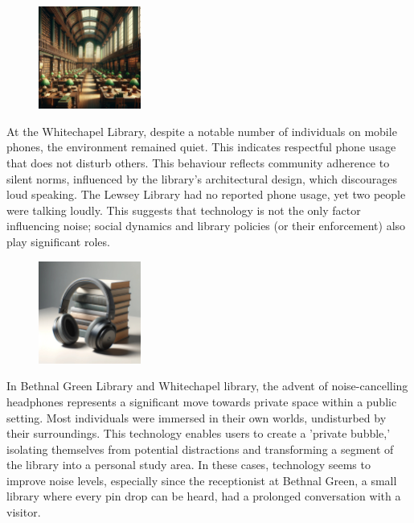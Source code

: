 \documentclass{novel}
\begin{document}
\begin{figure} 
\vspace{-\intextsep}
    \includegraphics[width=0.3\textwidth]{resources/whitechapel.jpg}
\end{figure}
At the Whitechapel Library, despite a notable number of individuals on mobile phones, the environment remained quiet. This indicates respectful phone usage that does not disturb others. This behaviour reflects community adherence to silent norms, influenced by the library's architectural design, which discourages loud speaking. The Lewsey Library had no reported phone usage, yet two people were talking loudly. This suggests that technology is not the only factor influencing noise; social dynamics and library policies (or their enforcement) also play significant roles.

\begin{figure} 
    \includegraphics[width=0.3\textwidth]{resources/headphones.jpg}
\end{figure}
In Bethnal Green Library and Whitechapel library, the advent of noise-cancelling headphones represents a significant move towards private space within a public setting. Most individuals were immersed in their own worlds, undisturbed by their surroundings. This technology enables users to create a 'private bubble,' isolating themselves from potential distractions and transforming a segment of the library into a personal study area. In these cases, technology seems to improve noise levels, especially since the receptionist at Bethnal Green, a small library where every pin drop can be heard, had a prolonged conversation with a visitor.
\end{document}
